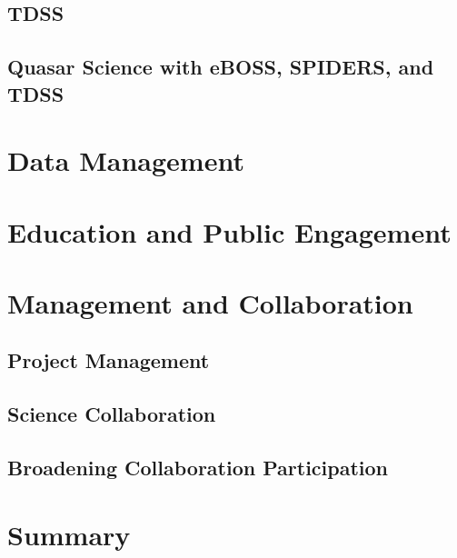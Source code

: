 \documentclass[twocolumn,tighten]{aastex61}
\begin{document}
\subsection{TDSS}
\label{sec:tdss}


\subsection{Quasar Science with eBOSS, SPIDERS, and TDSS}
\label{sec:quasars}


\section{Data Management}
\label{sec:data}


\section{Education and Public Engagement}
\label{sec:epo}


\section{Management and Collaboration}
\label{sec:management}
\subsection{Project Management}
\label{sec:project}


\subsection{Science Collaboration}
\label{sec:collaboration}


\subsection{Broadening Collaboration Participation}
\label{sec:climate}


\section{Summary}
\label{sec:summary}


\acknowledgments




 
\end{document}
